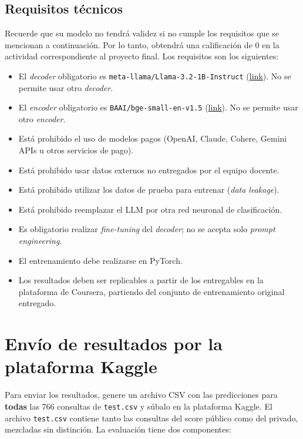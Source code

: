 \documentclass{article}
\begin{document}
\subsection{Requisitos técnicos}

Recuerde que su modelo no tendrá validez si no cumple los requisitos que se mencionan a
continuación. Por lo tanto, obtendrá una calificación de 0 en la actividad correspondiente al
proyecto final.  Los requisitos son los siguientes:

\begin{itemize}
    \item El \textit{decoder} obligatorio es \texttt{meta-llama/Llama-3.2-1B-Instruct} (\href{https://huggingface.co/meta-llama/Llama-3.2-1B-Instruct}{link}). No se permite usar otro \textit{decoder}.
    \item El \textit{encoder} obligatorio es \texttt{BAAI/bge-small-en-v1.5} (\href{https://huggingface.co/BAAI/bge-small-en-v1.5}{link}). No se permite usar otro \textit{encoder}.
    \item Está prohibido el uso de modelos pagos (OpenAI, Claude, Cohere, Gemini APIs u otros servicios de pago).
    \item Está prohibido usar datos externos no entregados por el equipo docente.
    \item Está prohibido utilizar los datos de prueba para entrenar (\textit{data leakage}).
    \item Está prohibido reemplazar el LLM por otra red neuronal de clasificación.
    \item Es obligatorio realizar \textit{fine-tuning} del \textit{decoder}; no se acepta solo \textit{prompt engineering}.
    \item El entrenamiento debe realizarse en PyTorch.
    \item Los resultados deben ser replicables a partir de los entregables en la plataforma de Coursera, partiendo del conjunto de entrenamiento original entregado.
\end{itemize}


\section{Envío de resultados por la plataforma Kaggle}
Para enviar los resultados, genere un archivo CSV con las predicciones para \textbf{todas} las 766 consultas de \texttt{test.csv} y súbalo en la plataforma Kaggle. El archivo \texttt{test.csv} contiene tanto las consultas del score público como del privado, mezcladas sin distinción. La evaluación tiene dos componentes:
\end{document}

